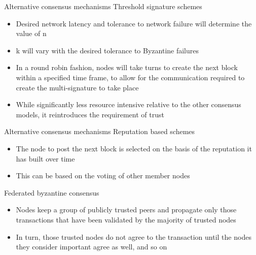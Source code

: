 \documentclass[11pt]{beamer}
\begin{document}

\begin{frame}{Alternative consensus mechanisms}
	Threshold signature schemes
	\begin{itemize}
		\item Desired network latency and tolerance to network failure will determine the value of n
		\item k will vary with the desired tolerance to Byzantine failures
		\item In a round robin fashion, nodes will take turns to create the next block within a specified time frame, to allow for the communication required to create the multi-signature to take place
		\item While significantly less resource intensive relative to the other consensus models, it reintroduces the requirement of trust
	\end{itemize}
\end{frame}


\begin{frame}{Alternative consensus mechanisms}
	Reputation based schemes
	\begin{itemize}
		\item The node to post the next block is selected on the basis of the reputation it has built over time
		\item This can be based on the voting of other member nodes
	\end{itemize}
	Federated byzantine consensus
	\begin{itemize}
		\item Nodes keep a group of publicly trusted peers and propagate only those transactions that have been validated by the majority of trusted nodes
		\item In turn, those trusted nodes do not agree to the transaction until the nodes they consider important agree as well, and so on
	\end{itemize}
\end{frame}

\end{document}
